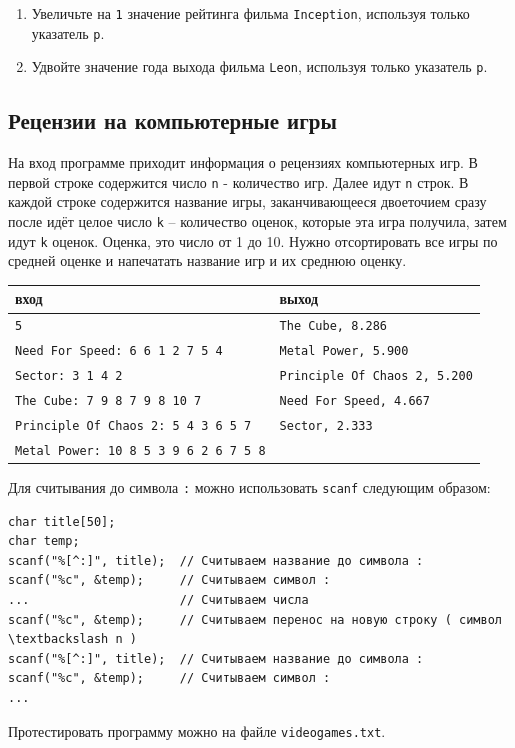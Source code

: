 \documentclass[10pt]{article}
\begin{document}
\begin{enumerate}
\begin{enumerate}
\item Увеличьте на \texttt{1} значение рейтинга фильма \texttt{Inception}, используя только указатель \texttt{p}.
\item Удвойте значение года выхода фильма \texttt{Leon}, используя только указатель \texttt{p}.
\end{enumerate}
\end{enumerate}




\subsection{Рецензии на компьютерные игры}
На вход программе приходит информация о рецензиях компьютерных игр. В первой строке содержится число \texttt{n} - количество игр. Далее идут \texttt{n} строк. В каждой строке содержится название игры, заканчивающееся двоеточием сразу после идёт целое число \texttt{k} -- количество оценок, которые эта игра получила, затем идут \texttt{k} оценок. Оценка, это число от 1 до 10. Нужно отсортировать все игры по средней оценке и напечатать название игр и их среднюю оценку.

\begin{center}
\begin{tabular}{ l | l }
 вход & выход \\ \hline
 \texttt{5} & 								  \texttt{The Cube, 8.286} \\
 \texttt{Need For Speed: 6 6 1 2 7 5 4} &      \texttt{Metal Power, 5.900 } \\
 \texttt{Sector: 3 1 4 2} & 					  \texttt{Principle Of Chaos 2, 5.200} \\
 \texttt{The Cube: 7 9 8 7 9 8 10 7} &          \texttt{Need For Speed, 4.667 } \\
 \texttt{Principle Of Chaos 2: 5 4 3 6 5 7} &     \texttt{Sector, 2.333} \\
 \texttt{Metal Power: 10 8 5 3 9 6 2 6 7 5 8} & \\
\end{tabular}
\end{center}
Для считывания до символа \texttt{:} можно использовать \texttt{scanf} следующим образом:
\begin{lstlisting}
char title[50];
char temp;
scanf("%[^:]", title);  // Считываем название до символа :
scanf("%c", &temp);     // Считываем символ :
...                     // Считываем числа
scanf("%c", &temp);     // Считываем перенос на новую строку ( символ \textbackslash n )
scanf("%[^:]", title);  // Считываем название до символа :
scanf("%c", &temp);     // Считываем символ :
...
\end{lstlisting}
Протестировать программу можно на файле \texttt{videogames.txt}.
\end{document}
